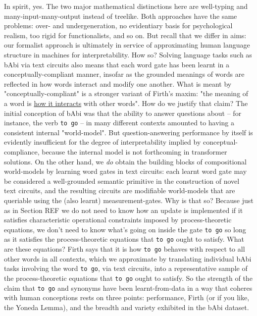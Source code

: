  In spirit, yes. The two major mathematical distinctions here are well-typing and many-input-many-output instead of treelike. Both approaches have the same problems: over- and undergeneration, no evidentiary basis for psychological realism, too rigid for functionalists, and so on. But recall that we differ in aims: our formalist approach is ultimately in service of approximating human language structure in machines for interpretability. How so? Solving language tasks such as bAbi via text circuits also means that each word gate has been learnt in a conceptually-compliant manner, insofar as the grounded meanings of words are reflected in how words interact and modify one another. What is meant by "conceptually-compliant" is a stronger variant of Firth's maxim: "the meaning of a word is \underline{how it interacts} with other words". How do we justify that claim? The initial conception of bAbi was that the ability to answer questions about -- for instance, the verb \texttt{to go} -- in many different contexts amounted to having a consistent internal "world-model". But question-answering performance by itself is evidently insufficient for the degree of interpretability implied by conceptual-compliance, because the internal model is not forthcoming in transformer solutions. On the other hand, we \emph{do} obtain the building blocks of compositional world-models by learning word gates in text circuits: each learnt word gate may be considered a well-grounded semantic primitive in the construction of novel text circuits, and the resulting circuits are modifiable world-models that are queriable using the (also learnt) measurement-gates. Why is that so? Because just as in Section \bR REF \e we do not need to know how an update is implemented if it satisfies characteristic operational constraints imposed by process-theoretic equations, we don't need to know what's going on inside the gate \texttt{to go} so long as it satisfies the process-theoretic equations that \texttt{to go} ought to satisfy. What are these equations? Firth says that it is how \texttt{to go} behaves with respect to all other words in all contexts, which we approximate by translating individual bAbi tasks involving the word \texttt{to go}, via text circuits, into a representative sample of the process-theoretic equations that \texttt{to go} ought to satisfy. So the strength of the claim that \texttt{to go} and synonyms have been learnt-from-data in a way that coheres with human conceptions rests on three points: performance, Firth (or if you like, the Yoneda Lemma), and the breadth and variety exhibited in the bAbi dataset.